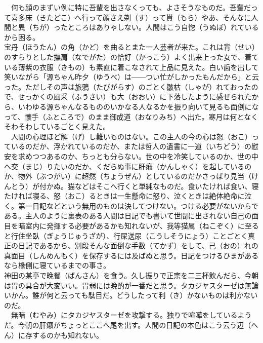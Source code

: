 　何も顔のまずい例に特に吾輩を出さなくっても、よさそうなものだ。吾輩だって喜多床（きたどこ）へ行って顔さえ剃（す）って貰（もら）やあ、そんなに人間と異（ちが）ったところはありゃしない。人間はこう自惚（うぬぼ）れているから困る。\\

宝丹（ほうたん）の角（かど）を曲るとまた一人芸者が来た。これは背（せい）のすらりとした撫肩（なでがた）の恰好（かっこう）よく出来上った女で、着ている薄紫の衣服（きもの）も素直に着こなされて上品に見えた。白い歯を出して笑いながら「源ちゃん昨夕（ゆうべ）は――つい忙がしかったもんだから」と云った。ただしその声は旅鴉（たびがらす）のごとく皺枯（しゃが）れておったので、せっかくの風采（ふうさい）も大（おおい）に下落したように感ぜられたから、いわゆる源ちゃんなるもののいかなる人なるかを振り向いて見るも面倒になって、懐手（ふところで）のまま御成道（おなりみち）へ出た。寒月は何となくそわそわしているごとく見えた。\\

　人間の心理ほど解（げ）し難いものはない。この主人の今の心は怒（おこ）っているのだか、浮かれているのだか、または哲人の遺書に一道（いちどう）の慰安を求めつつあるのか、ちっとも分らない。世の中を冷笑しているのか、世の中へ交（まじ）りたいのだか、くだらぬ事に肝癪（かんしゃく）を起しているのか、物外（ぶつがい）に超然（ちょうぜん）としているのだかさっぱり見当（けんとう）が付かぬ。猫などはそこへ行くと単純なものだ。食いたければ食い、寝たければ寝る、怒（おこ）るときは一生懸命に怒り、泣くときは絶体絶命に泣く。第一日記などという無用のものは決してつけない。つける必要がないからである。主人のように裏表のある人間は日記でも書いて世間に出されない自己の面目を暗室内に発揮する必要があるかも知れないが、我等猫属（ねこぞく）に至ると行住坐臥（ぎょうじゅうざが）、行屎送尿（こうしそうにょう）ことごとく真正の日記であるから、別段そんな面倒な手数（てかず）をして、己（おの）れの真面目（しんめんもく）を保存するには及ばぬと思う。日記をつけるひまがあるなら椽側に寝ているまでの事さ。\\

神田の某亭で晩餐（ばんさん）を食う。久し振りで正宗を二三杯飲んだら、今朝は胃の具合が大変いい。胃弱には晩酌が一番だと思う。タカジヤスターゼは無論いかん。誰が何と云っても駄目だ。どうしたって利（き）かないものは利かないのだ。\\

　無暗（むやみ）にタカジヤスターゼを攻撃する。独りで喧嘩をしているようだ。今朝の肝癪がちょっとここへ尾を出す。人間の日記の本色はこう云う辺（へん）に存するのかも知れない。\\

